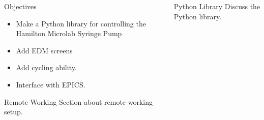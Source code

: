 \documentclass[final,t]{beamer}
\begin{document}
\begin{frame}
\begin{columns}[t]
\begin{column}{.32\linewidth}
  \begin{custombox}{Objectives}
     \begin{itemize}
        \item Make a Python library for controlling the Hamilton Microlab Syringe Pump 
        \item Add EDM screens 
        \item Add cycling ability. 
        \item Interface with EPICS. 
    \end{itemize} 
  \end{custombox}

      \begin{figure}[t]
          {%
        \setlength{\fboxsep}{0pt}%
        \setlength{\fboxrule}{3pt}%
        }%
\centering
      \end{figure}

  \begin{custombox}{Remote Working}
      Section about remote working setup.
  \end{custombox}
  \end{column}



  \begin{column}{.32\linewidth}

  \begin{custombox}{Python Library}
    Discuss the Python library. 
  \end{custombox}
  

\end{column}
\end{columns}
\end{frame}
\end{document}
